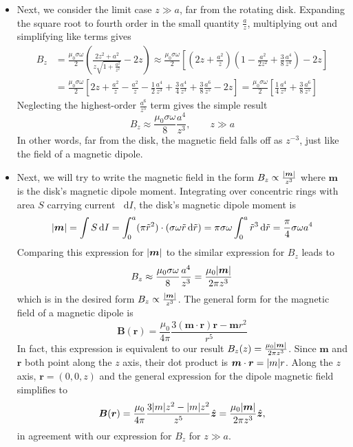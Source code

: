 \documentclass[11pt, a4paper]{article}
\newcommand{\diff}{\mathop{}\!\mathrm{d}} %
\renewcommand{\vec}[1]{\bm{#1}} %
\newcommand{\uvec}[1]{\hat{\vec{#1}}} %
\renewcommand{\t}[1]{\tilde{#1}} %
\renewcommand{\r}{\vec{r}}
\newcommand{\B}{\vec{B}}  %
\newcommand{\m}{\vec{m}}  %
\begin{document}
\begin{itemize}
	\item Next, we consider the limit case $ z \gg a $, far from the rotating disk. Expanding the square root to fourth order in the small quantity $ \frac{a}{z} $, multiplying out and simplifying like terms gives
	\begin{align*}
		B_{z} &= \frac{\mu_{0}\sigma \omega}{2} \left(\frac{2z^{2} + a^{2}}{z\sqrt{1 + \frac{a^{2}}{z^{2}}}} - 2z\right) \approx \frac{\mu_{0}\sigma \omega}{2} \left[\left(2z + \frac{a^{2}}{z}\right)\left(1 - \frac{a^{2}}{2z^{2}} + \frac{3}{8}\frac{a^{4}}{z^{4}}\right) - 2z \right]\\
		& = \frac{\mu_{0}\sigma \omega}{2} \left[2z + \frac{a^{2}}{z} - \frac{a^{2}}{z} - \frac{1}{2}\frac{a^{4}}{z^{3}} + \frac{3}{4}\frac{a^{4}}{z^{3}} + \frac{3}{8}\frac{a^{6}}{z^{5}} - 2z\right] = \frac{\mu_{0}\sigma \omega}{2} \left[ \frac{1}{4}\frac{a^{4}}{z^{3}} + \frac{3}{8}\frac{a^{6}}{z^{5}}\right] 
	\end{align*}
	Neglecting the highest-order $ \frac{a^{6}}{z^{5}} $ term gives the simple result
	\begin{equation*}
		B_{z} \approx  \frac{\mu_{0}\sigma \omega}{8} \frac{a^{4}}{z^{3}}, \qquad z \gg a
	\end{equation*}
	In other words, far from the disk, the magnetic field falls off as $ z^{-3} $, just like the field of a magnetic dipole.
	
	\item Next, we will try to write the magnetic field in the form $ B_{z} \propto \frac{\abs{\m}}{z^{3}} $ where $ \m $ is the disk's magnetic dipole moment. Integrating over concentric rings with area $ S $ carrying current $ \diff I $, the disk's magnetic dipole moment is
	\begin{equation*}
		\abs{\m} = \int S \diff I = \int_{0}^{a} (\pi \t{r}^{2}) \cdot (\sigma \omega \t{r}\diff \t{r}) = \pi \sigma \omega \int_{0}^{a} \t{r}^{3} \diff \t{r} = \frac{\pi}{4}\sigma \omega a^{4}
	\end{equation*}
	Comparing this expression for $ \abs{\m} $ to the similar expression for $ B_{z} $ leads to 
	\begin{equation*}
		B_{z} \approx  \frac{\mu_{0}\sigma \omega}{8} \frac{a^{4}}{z^{3}} = \frac{\mu_{0}\abs{\m}}{2\pi z^{3}}
	\end{equation*}	
	which is in the desired form $  B_{z} \propto \frac{\abs{\m}}{z^{3}} $. The general form for the magnetic field of a magnetic dipole is
	\begin{equation*}
		\B(\r) = \frac{\mu_{0}}{4\pi}\frac{3(\m \cdot \r)\r - \m r^{2}}{r^{5}}
	\end{equation*}
	In fact, this expression is equivalent to our result $ B_{z}(z) = \frac{\mu_{0}\abs{\m}}{2\pi z^{3}} $. Since $ \m $ and $ \r $ both point along the $ z $ axis, their dot product is $ \m \cdot \r = \abs{m}r $. Along the $ z $ axis, $ \r = (0, 0, z) $ and the general expression for the dipole magnetic field simplifies to
	\begin{equation*}
		\B(\r) = \frac{\mu_{0}}{4\pi} \frac{3\abs{m}z^{2} - \abs{m}z^{2}}{z^{5}}\uvec{z} = \frac{\mu_{0}\abs{\m}}{2\pi z^{3}} \uvec{z},
	\end{equation*}
	in agreement with our expression for $ B_{z} $ for $ z \gg a $.
	

\end{itemize}
\end{document}
